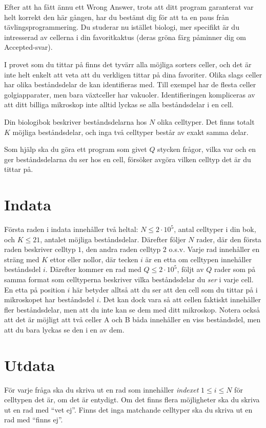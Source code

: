 Efter att ha fått ännu ett Wrong Answer, trots att ditt program garanterat var helt korrekt den här gången, har du bestämt dig för att ta en paus från tävlingsprogrammering.
Du studerar nu istället biologi, mer specifikt är du intresserad av cellerna i din favoritkaktus (deras gröna färg påminner dig om Accepted-svar).

I provet som du tittar på finns det tyvärr alla möjliga sorters celler, och det är inte helt enkelt att veta att du verkligen tittar på dina favoriter.
Olika slags celler har olika beståndsdelar de kan identifieras med.
Till exempel har de flesta celler golgiapparater, men bara växtceller har vakuoler.
Identifieringen kompliceras av att ditt billiga mikroskop inte alltid lyckas se alla beståndsdelar i en cell.

Din biologibok beskriver beståndsdelarna hos $N$ olika celltyper.
Det finns totalt $K$ möjliga beståndsdelar, och inga två celltyper består av exakt samma delar.

Som hjälp ska du göra ett program som givet $Q$ stycken frågor, vilka var och en ger beståndsdelarna du ser hos en cell, försöker avgöra vilken celltyp det är du tittar på.

\section*{Indata}
Första raden i indata innehåller två heltal: $N \leq 2\cdot 10^5$, antal celltyper i din bok, och $K \leq 21$, antalet möjliga beståndsdelar.
Därefter följer $N$ rader, där den första raden beskriver celltyp $1$, den andra raden celltyp $2$ o.s.v.
Varje rad innehåller en sträng med $K$ ettor eller nollor, där tecken $i$ är en etta om celltypen innehåller beståndsdel $i$.
Därefter kommer en rad med $Q \leq 2\cdot 10^5$, följt av $Q$ rader som på samma format som celltyperna beskriver vilka beståndsdelar du \textit{ser} i varje cell.
En etta på position $i$ här betyder alltså att du ser att den cell som du tittar på i mikroskopet har beståndsdel $i$.
Det kan dock vara så att cellen faktiskt innehåller fler beståndsdelar, men att du inte kan se dem med ditt mikroskop.
Notera också att det är möjligt att två celler A och B båda innehåller en viss beståndsdel, men att du
bara lyckas se den i en av dem.

\section*{Utdata}
För varje fråga ska du skriva ut en rad som innehåller \textit{indexet} $1 \leq i \leq N$ för celltypen det är, om det är entydigt.
Om det finns flera möjligheter ska du skriva ut en rad med ``vet ej''.
Finns det inga matchande celltyper ska du skriva ut en rad med ``finns ej''.

